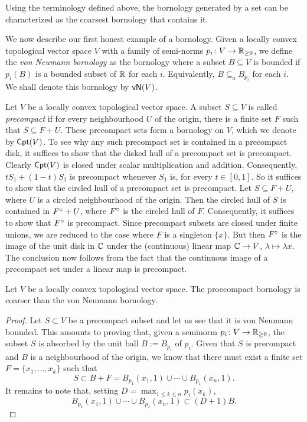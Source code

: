 Using the terminology defined above, the bornology generated by a set can be characterized as the coarsest 
bornology that contains it.


\begin{example}
    We now describe our first honest example of a bornology. Given a locally convex topological vector space \(V\) with a family of semi-norms \(p_i \colon V \to \mathbb R_{\geq 0}\), we define the \emph{von Neumann bornology} as the bornology where a subset \(B \subseteq V\) is bounded if \(p_i(B)\) is a bounded subset of \(\mathbb R\) for each \(i\). Equivalently, \(B \subseteq_a B_{p_i}\) for each \(i\). We shall denote this bornology by \(\mathsf{vN}(V)\).
\end{example}

\begin{example}
    Let \(V\) be a locally convex topological vector space. A subset \(S \subseteq V\) is called \emph{precompact} if for every neighbourhood \(U\) of the origin, there is a finite set \(F\) such that \(S \subseteq F + U\). These precompact sets form a bornology on \(V\), which we denote by \(\mathsf{Cpt}(V)\). To see why any such precompact set is contained in a precompact disk, it suffices to show that the disked hull of a precompact set is precompact. Clearly \(\mathsf{Cpt}(V)\) is closed under scalar multiplication and addition. Consequently, \(t S_1 + (1-t)S_1\) is precompact whenever \(S_1\) is, for every \(t\in [0,1]\). So it suffices to show that the circled hull of a precompact set is precompact. Let \(S \subseteq F + U\), where \(U\) is a circled neighbourhood of the origin. Then the circled hull of \(S\) is contained in \(F^\circ + U\), where \(F^\circ\) is the circled hull of \(F\). Consequently, it suffices to show that \(F^\circ\) is precompact. Since precompact subsets are closed under finite unions, we are reduced to the case where \(F\) is a singleton \(\{x\}\). But then \(F^\circ\) is the image of the unit disk in \(\mathbb C\) under the (continuous) linear map \(\mathbb C \to V\), \(\lambda \mapsto \lambda x\). The conclusion now follows from the fact that the continuous image of a precompact set under a linear map is precompact. 
\end{example}

\begin{proposition} \label{prop:Cpt-coarser-vN} Let $V$ be a locally convex topological
vector space. The proecompact bornology is coarser than the von Neumann bornology. 
\end{proposition}
\begin{proof} Let $S \subset V$ be a precompact subset and let us see that it is von Neumann bounded.
This amounts to proving that, given a seminorm $p_i \colon V \to \mathbb R_{\ge 0}$, 
the subset $S$ is absorbed by the unit ball $B := B_{p_i}$ of $p_i$. Given that $S$ is precompact
and $B$ is a neighbourhood of the origin, we know that there must exist a finite set 
$F = \{x_1, \ldots, x_k\}$ such that 
\[
S \subset B + F = B_{p_1}(x_1,1) \cup \cdots \cup B_{p_1}(x_n, 1).    
\]
It remains to note that, setting $D = \max_{1 \leq k \leq n} p_i(x_k)$, 
\[
    B_{p_1}(x_1,1) \cup \cdots \cup B_{p_1}(x_n, 1)
    \subset (D+1)B. 
\]
\end{proof}

